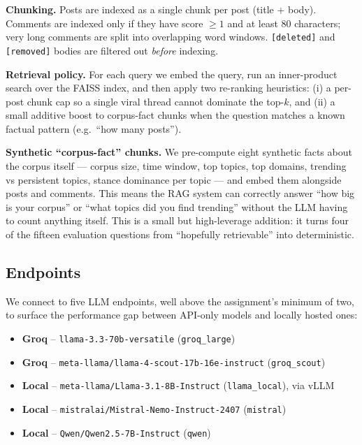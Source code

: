 \documentclass[11pt,a4paper]{article}
\newenvironment{extrabox}{%
  \par\medskip\noindent
  \def\FrameCommand{\fboxsep=6pt\fboxrule=0.6pt%
    \fcolorbox{extraboxrule}{extraboxbg}}%
  \MakeFramed{\advance\hsize-2\fboxsep\FrameRestore}%
  \noindent{\sffamily\bfseries\color{extraboxrule}Extra step.}\quad\ignorespaces%
}{\endMakeFramed\par\medskip}
\newenvironment{designbox}{%
  \par\medskip\noindent
  \def\FrameCommand{\fboxsep=6pt\fboxrule=0.4pt%
    \fcolorbox{designboxrule}{designboxbg}}%
  \MakeFramed{\advance\hsize-2\fboxsep\FrameRestore}%
  \noindent{\sffamily\bfseries Design choice.}\quad\ignorespaces%
}{\endMakeFramed\par\medskip}
\begin{document}
\begin{designbox}
\textbf{Chunking.} Posts are indexed as a single chunk per post (title + body). Comments are
indexed only if they have score $\geq 1$ and at least 80 characters; very long comments are split
into overlapping word windows. \texttt{[deleted]} and \texttt{[removed]} bodies are filtered out
\emph{before} indexing.

\textbf{Retrieval policy.} For each query we embed the query, run an inner-product search over
the FAISS index, and then apply two re-ranking heuristics: (i) a per-post chunk cap so a single
viral thread cannot dominate the top-$k$, and (ii) a small additive boost to corpus-fact chunks
when the question matches a known factual pattern (e.g.\ ``how many posts'').
\end{designbox}

\begin{extrabox}
\textbf{Synthetic ``corpus-fact'' chunks.} We pre-compute eight synthetic facts about the corpus
itself --- corpus size, time window, top topics, top domains, trending vs persistent topics,
stance dominance per topic --- and embed them alongside posts and comments. This means the RAG
system can correctly answer ``how big is your corpus'' or ``what topics did you find trending''
without the LLM having to count anything itself. This is a small but high-leverage addition: it
turns four of the fifteen evaluation questions from ``hopefully retrievable'' into deterministic.
\end{extrabox}

\subsection{Endpoints}
We connect to five LLM endpoints, well above the assignment's minimum of two, to surface the
performance gap between API-only models and locally hosted ones:

\begin{itemize}
  \item \textbf{Groq} -- \texttt{llama-3.3-70b-versatile} (\texttt{groq\_large})
  \item \textbf{Groq} -- \texttt{meta-llama/llama-4-scout-17b-16e-instruct} (\texttt{groq\_scout})
  \item \textbf{Local} -- \texttt{meta-llama/Llama-3.1-8B-Instruct} (\texttt{llama\_local}), via vLLM
  \item \textbf{Local} -- \texttt{mistralai/Mistral-Nemo-Instruct-2407} (\texttt{mistral})
  \item \textbf{Local} -- \texttt{Qwen/Qwen2.5-7B-Instruct} (\texttt{qwen})
\end{itemize}
\end{document}
